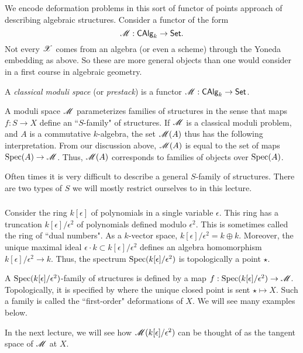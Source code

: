 \documentclass[11pt]{amsart}
\def\Spec{{\rm Spec}}
\begin{document}
We encode deformation problems in this sort of functor of points approach of describing algebraic structures. 
Consider a functor of the form
\[
\mathscr M : {\sf CAlg}_k \to {\sf Set} .
\]
Not every $\mathscr X$ comes from an algebra (or even a scheme) through the Yoneda embedding as above.
So these are more general objects than one would consider in a first course in algebraic geometry. 

\begin{dfn}
A {\em classical moduli space} (or {\em prestack}) is a functor $\mathscr M : {\sf CAlg}_k \to {\sf Set}$. 
\end{dfn}

A moduli space $\mathscr M$ parameterizes families of structures in the sense that maps $f : S \to X$ define an ``$S$-family" of structures. 
If $\mathscr M$ is a classical moduli problem, and $A$ is a commutative $k$-algebra, the set $\mathscr M(A)$ thus has the following interpretation. 
From our discussion above, $\mathscr M(A)$ is equal to the set of maps ${\rm Spec}(A) \to \mathscr M$. 
Thus, $\mathscr M(A)$ corresponds to families of objects over ${\rm Spec}(A)$. 

Often times it is very difficult to describe a general $S$-family of structures. 
There are two types of $S$ we will mostly restrict ourselves to in this lecture.

\subsubsection{}

Consider the ring $k[\epsilon]$ of polynomials in a single variable $\epsilon$. 
This ring has a truncation $k[\epsilon] / \epsilon^2$ of polynomials defined modulo $\epsilon^2$.
This is sometimes called the ring of ``dual numbers". 
As a $k$-vector space, $k[\epsilon] / \epsilon^2 = k \oplus k$.
Moreover, the unique maximal ideal $\epsilon \cdot k \subset k[\epsilon]/\epsilon^2$ defines an algebra homomorphism $k[\epsilon]/\epsilon^2 \to k$. 
Thus, the spectrum $\Spec(k[\epsilon]/\epsilon^2)$ is topologically a point $\star$. 

A $\Spec(k[\epsilon]/\epsilon^2)$-family of structures is defined by a map $f : \Spec(k[\epsilon]/\epsilon^2) \to \sM$.
Topologically, it is specified by where the unique closed point is sent $\star \mapsto X$.
Such a family is called the ``first-order" deformations of $X$. 
We will see many examples below. 

\begin{rmk}
In the next lecture, we will see how $\mathscr M(k[\epsilon]/\epsilon^2)$ can be thought of as the tangent space of $\mathscr M$ at $X$.
\end{rmk}
\end{document}
